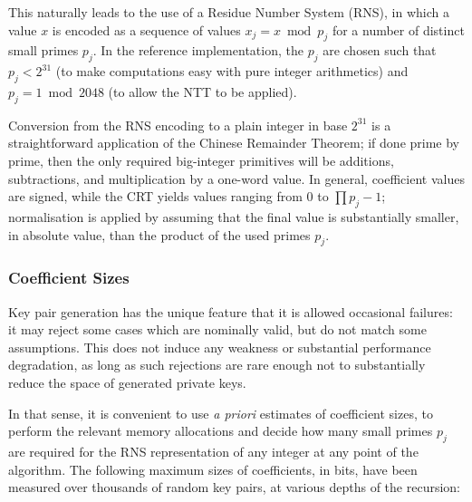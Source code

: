 This naturally leads to the use of a Residue Number System (RNS), in
which a value $x$ is encoded as a sequence of values $x_j = x \bmod p_j$
for a number of distinct small primes $p_j$. In the \falcon reference
implementation, the $p_j$ are chosen such that $p_j < 2^{31}$ (to make
computations easy with pure integer arithmetics) and $p_j = 1 \bmod 2048$
(to allow the NTT to be applied).

Conversion from the RNS encoding to a plain integer in base $2^{31}$ is
a straightforward application of the Chinese Remainder Theorem; if done
prime by prime, then the only required big-integer primitives will be
additions, subtractions, and multiplication by a one-word value. In
general, coefficient values are signed, while the CRT yields values
ranging from $0$ to $\prod p_j - 1$; normalisation is applied by
assuming that the final value is substantially smaller, in absolute
value, than the product of the used primes $p_j$.

\subsubsection{Coefficient Sizes}

Key pair generation has the unique feature that it is allowed occasional
failures: it may reject some cases which are nominally valid, but do not
match some assumptions. This does not induce any weakness or substantial
performance degradation, as long as such rejections are rare enough not
to substantially reduce the space of generated private keys.

In that sense, it is convenient to use \emph{a priori} estimates of
coefficient sizes, to perform the relevant memory allocations and decide
how many small primes $p_j$ are required for the RNS representation of
any integer at any point of the algorithm. The following maximum sizes
of coefficients, in bits, have been measured over thousands of random
key pairs, at various depths of the recursion:

